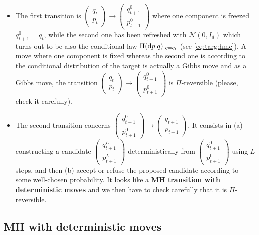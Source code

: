 \documentclass[english,graybox,envcountchap,envcountsame,sectrefs,shortlabels]{svmono}
\theoremstyle{style}
\newcommand{\gauss}{\mathcal{N}}
\begin{document}
\begin{itemize}
\item The first transition is $\begin{pmatrix}
q_t\\
p_t
\end{pmatrix} \rightarrow
\begin{pmatrix}
q_{t+1}^0\\
p_{t+1}^0
\end{pmatrix}$
where one component is freezed $q_{t+1}^0=q_t$, while the second one has been refreshed with $\gauss(0,I_d)$ which turns out to be also the conditional law $\Pi(\mathrm{d} p|q)|_{q=q_t}$ (see \eqref{eq:targ:hmc}). A move where one component is fixed whereas the second one is according to the conditional distribution of the target is actually a Gibbs move and as a Gibbs move, the transition $\begin{pmatrix}
q_t\\
p_t
\end{pmatrix} \rightarrow
\begin{pmatrix}
q_{t+1}^0\\
p_{t+1}^0
\end{pmatrix}$ is $\Pi$-reversible (please, check it carefully).
\item The second transition concerns $\begin{pmatrix}
q_{t+1}^0\\
p_{t+1}^0
\end{pmatrix} \rightarrow
\begin{pmatrix}
q_{t+1}\\
p_{t+1}
\end{pmatrix}$. It consists in (a) constructing a candidate $\begin{pmatrix}
q_{t+1}^L\\
p_{t+1}^L
\end{pmatrix}$ deterministically from $\begin{pmatrix}
q_{t+1}^0\\
p_{t+1}^0
\end{pmatrix}$ using $L$ steps, and then (b) accept or refuse the proposed candidate according to some well-chosen probability. It looks like a  {\bf MH transition with deterministic moves} and we then have to check carefully that it is $\Pi$-reversible.
\end{itemize}

\subsection{MH with deterministic moves}
\end{document}
